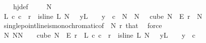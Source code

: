 \begin{isabellebody}
%
\isadelimproof
\ \ %
\endisadelimproof
%
\isatagproof
{}\isamarkupfalse%
\ hj{\isacharunderscore}{\kern0pt}def\ \isanewline
{}\isamarkupfalse%
{\isacharminus}{\kern0pt}\isanewline
\ \ \isamarkupfalse%
\ {\isacharquery}{\kern0pt}N\ {\isacharequal}{\kern0pt}\ {}\isanewline
\ \ \isamarkupfalse%
\ {\isachardoublequoteopen}{\isasymexists}L\ c{\isachardot}{\kern0pt}\ c\ {\isacharless}{\kern0pt}\ r\ {\isasymand}\ is{\isacharunderscore}{\kern0pt}line\ L\ N{\isacharprime}{\kern0pt}\ {}\ {\isasymand}\ {\isacharparenleft}{\kern0pt}{\isasymforall}y{\isasymin}L\ {\isacharbackquote}{\kern0pt}\ {\isacharbraceleft}{\kern0pt}{\isachardot}{\kern0pt}{\isachardot}{\kern0pt}{\isacharless}{\kern0pt}{}{\isacharbraceright}{\kern0pt}{\isachardot}{\kern0pt}\ {\isasymchi}\ y\ {\isacharequal}{\kern0pt}\ c{\isacharparenright}{\kern0pt}{\isachardoublequoteclose}\ \ {\isachardoublequoteopen}N{\isacharprime}{\kern0pt}\ {\isasymge}\ {\isacharquery}{\kern0pt}N{\isachardoublequoteclose}\ {\isachardoublequoteopen}{\isasymchi}\ {\isasymin}\ cube\ N{\isacharprime}{\kern0pt}\ {}\ {\isasymrightarrow}\isactrlsub E\ {\isacharbraceleft}{\kern0pt}{\isachardot}{\kern0pt}{\isachardot}{\kern0pt}{\isacharless}{\kern0pt}r{\isacharbraceright}{\kern0pt}{\isachardoublequoteclose}\ \ N{\isacharprime}{\kern0pt}\ {\isasymchi}\ \isamarkupfalse%
\ single{\isacharunderscore}{\kern0pt}point{\isacharunderscore}{\kern0pt}line{\isacharunderscore}{\kern0pt}is{\isacharunderscore}{\kern0pt}monochromatic{\isacharbrackleft}{\kern0pt}of\ {\isasymchi}\ N{\isacharprime}{\kern0pt}\ r{\isacharbrackright}{\kern0pt}\ that\ \isamarkupfalse%
\ force\isanewline
\ \ \isamarkupfalse%
\ \isamarkupfalse%
\ {\isachardoublequoteopen}{\isasymexists}N{\isachargreater}{\kern0pt}{}{\isachardot}{\kern0pt}\ {\isasymforall}N{\isacharprime}{\kern0pt}{\isasymge}N{\isachardot}{\kern0pt}\ {\isasymforall}{\isasymchi}{\isachardot}{\kern0pt}\ {\isasymchi}\ {\isasymin}\ cube\ N{\isacharprime}{\kern0pt}\ {}\ {\isasymrightarrow}\isactrlsub E\ {\isacharbraceleft}{\kern0pt}{\isachardot}{\kern0pt}{\isachardot}{\kern0pt}{\isacharless}{\kern0pt}r{\isacharbraceright}{\kern0pt}\ {\isasymlongrightarrow}\ {\isacharparenleft}{\kern0pt}{\isasymexists}L\ c{\isachardot}{\kern0pt}\ c\ {\isacharless}{\kern0pt}\ r\ {\isasymand}\ is{\isacharunderscore}{\kern0pt}line\ L\ N{\isacharprime}{\kern0pt}\ {}\ {\isasymand}\ {\isacharparenleft}{\kern0pt}{\isasymforall}y{\isasymin}L\ {\isacharbackquote}{\kern0pt}\ {\isacharbraceleft}{\kern0pt}{\isachardot}{\kern0pt}{\isachardot}{\kern0pt}{\isacharless}{\kern0pt}{}{\isacharbraceright}{\kern0pt}{\isachardot}{\kern0pt}\ {\isasymchi}\ y\ {\isacharequal}{\kern0pt}\ c{\isacharparenright}{\kern0pt}{\isacharparenright}{\kern0pt}{\isachardoublequoteclose}\ \isamarkupfalse%

\end{isabellebody}
